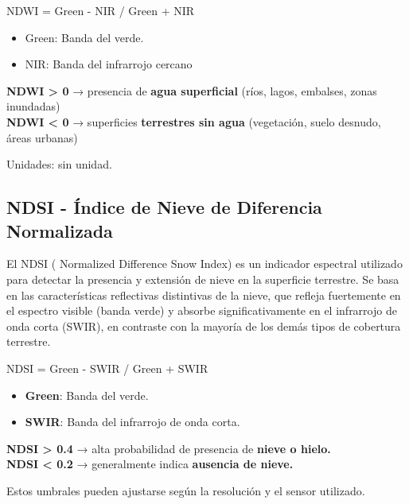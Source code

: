 \documentclass[
]{book}
\providecommand{\tightlist}{%
  \setlength{\itemsep}{0pt}\setlength{\parskip}{0pt}}
\begin{document}
NDWI = Green - NIR / Green + NIR\hspace{0pt}

\begin{itemize}
\tightlist
\item
  Green: Banda del verde.\\
\item
  NIR: Banda del infrarrojo cercano
\end{itemize}

\textbf{NDWI \textgreater{} 0} → presencia de \textbf{agua superficial} (ríos, lagos, embalses, zonas inundadas)\\
\textbf{NDWI \textless{} 0} → superficies \textbf{terrestres sin agua} (vegetación, suelo desnudo, áreas urbanas)

Unidades: sin unidad.

\subsection{\texorpdfstring{\textbf{NDSI} - Índice de Nieve de Diferencia Normalizada}{NDSI - Índice de Nieve de Diferencia Normalizada}}\label{ndsi---uxedndice-de-nieve-de-diferencia-normalizada}

El NDSI ( Normalized Difference Snow Index) es un indicador espectral utilizado para detectar la presencia y extensión de nieve en la superficie terrestre. Se basa en las características reflectivas distintivas de la nieve, que refleja fuertemente en el espectro visible (banda verde) y absorbe significativamente en el infrarrojo de onda corta (SWIR), en contraste con la mayoría de los demás tipos de cobertura terrestre.

NDSI = Green - SWIR / Green + SWIR\hspace{0pt}

\begin{itemize}
\tightlist
\item
  \textbf{Green}: Banda del verde.\\
\item
  \textbf{SWIR}: Banda del infrarrojo de onda corta.
\end{itemize}

\textbf{NDSI \textgreater{} 0.4} → alta probabilidad de presencia de \textbf{nieve o hielo.}\\
\textbf{NDSI \textless{} 0.2} → generalmente indica \textbf{ausencia de nieve.}

Estos umbrales pueden ajustarse según la resolución y el sensor utilizado.
\end{document}
